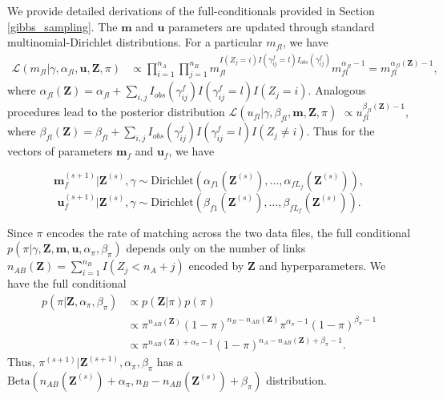 \documentclass[ba]{imsart}
\begin{document}
We provide detailed derivations of the full-conditionals provided in Section \ref{gibbs_sampling}. The $\bm{m}$ and $\bm{u}$ parameters are updated through standard multinomial-Dirichlet distributions. For a particular $m_{fl}$, we have
\begin{align*}
	\mathcal{L}(m_{fl}|\gamma, \alpha_{fl}, \bm{u}, \bm{Z}, \pi) &\propto \prod_{i=1}^{n_A} \prod_{j=1}^{n_B} m_{fl}^{I(Z_j = i) I(\gamma_{ij}^f = l) I_{obs}(\gamma_{ij}^f)}  m_{fl}^{\alpha_{fl} - 1} = m_{fl}^{\alpha_{fl}(\bm{Z}) - 1},
\end{align*}
where $\alpha_{fl}(\bm{Z})= \alpha_{fl} + \sum_{i,j} I_{obs}(\gamma_{ij}^f)I(\gamma_{ij}^f = l) I(Z_j = i)$. Analogous procedures lead to the posterior distribution $\mathcal{L}(u_{fl}| \gamma, \beta_{fl}, \bm{m}, \bm{Z}, \pi)$  $\propto u_{fl}^{\beta_{fl}(\bm{Z}) - 1}$, where $\beta_{fl}(\bm{Z})= \beta_{fl} + \sum_{i,j} I_{obs}(\gamma_{ij}^f)I(\gamma_{ij}^f = l) I(Z_j \neq i)$. Thus for the vectors of parameters $\bm{m}_f$ and $\bm{u}_f$, we have

$$\bm{m}_f^{(s+1)}|\bm{Z}^{(s)}, \gamma \sim \text{Dirichlet}(\alpha_{f1}(\bm{Z}^{(s)}), \ldots, \alpha_{fL_f}(\bm{Z}^{(s)})),$$
$$\bm{u}_f^{(s+1)}|\bm{Z}^{(s)}, \gamma \sim \text{Dirichlet}(\beta_{f1}(\bm{Z}^{(s)}), \ldots, \beta_{fL_f}(\bm{Z}^{(s)})).$$

Since $\pi$ encodes the rate of matching across the two data files, the full conditional $p(\pi|\gamma, \bm{Z}, \bm{m}, \bm{u}, \alpha_{\pi}, \beta_{\pi})$ depends only on the number of links $n_{AB}(\bm{Z}) = \sum_{i=1}^{n_B}I(Z_j < n_A + j)$ encoded by $\bm{Z}$ and hyperparameters. We have the full conditional
\begin{align*}
	p(\pi | \bm{Z}, \alpha_{\pi}, \beta_{\pi}) &\propto p(\bm{Z}|\pi)p(\pi) \\
	&\propto \pi^{n_{AB}(\bm{Z})} (1-\pi)^{n_B - n_{AB}(\bm{Z})} \pi^{\alpha_{\pi} -1} (1-\pi)^{\beta_{\pi} -1} \\
	&\propto \pi^{n_{AB}(\bm{Z}) + \alpha_{\pi} - 1} (1-\pi)^{n_A - n_{AB}(\bm{Z}) + \beta_{\pi} -1}.
\end{align*}
Thus, $\pi^{(s+1)}|\bm{Z}^{(s+1)},  \alpha_{\pi}, \beta_{\pi}$ has a $\text{Beta}(n_{AB}(\bm{Z}^{(s)}) + \alpha_{\pi}, n_B - n_{AB}(\bm{Z}^{(s)}) + \beta_{\pi})$ distribution.
\end{document}
